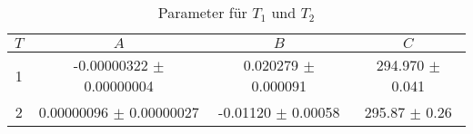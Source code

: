 \begin{table}
        \centering
        \label{tab:parameterabc}
        \begin{tabular}{c c c c}
        \toprule
        $T$ & $A$ & $B$ & $C$ \\
        \midrule
        1 & -0.00000322 $\pm$ 0.00000004 & 0.020279  $\pm$ 0.000091 & 294.970 $\pm$ 0.041 \\
        2 & 0.00000096  $\pm$ 0.00000027 & -0.01120 $\pm$ 0.00058 & 295.87 $\pm$ 0.26 \\
        \bottomrule
        \end{tabular}
        \caption{Parameter für $T_1$ und $T_2$}
        \end{table}